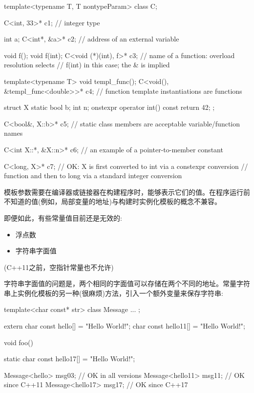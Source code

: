 \begin{cpp}
template<typename T, T nontypeParam>
class C;

C<int, 33>* c1; // integer type

int a;
C<int*, &a>* c2; // address of an external variable

void f();
void f(int);
C<void (*)(int), f>* c3; // name of a function: overload resolution selects
						// f(int) in this case; the & is implied

template<typename T> void templ_func();
C<void(), &templ_func<double>>* c4; // function template instantiations are functions

struct X {
	static bool b;
	int n;
	onstexpr operator int() const { return 42; }
};

C<bool&, X::b>* c5; // static class members are acceptable variable/function names

C<int X::*, &X::n>* c6; // an example of a pointer-to-member constant

C<long, X{}>* c7; // OK: X is first converted to int via a constexpr conversion
// function and then to long via a standard integer conversion
\end{cpp}

模板参数需要在编译器或链接器在构建程序时，能够表示它们的值。在程序运行前不知道的值(例如，局部变量的地址)与构建时实例化模板的概念不兼容。

即便如此，有些常量值目前还是无效的:

\begin{itemize}
\item 
浮点数

\item 
字符串字面值
\end{itemize}

(C++11之前，空指针常量也不允许)

字符串字面值的问题是，两个相同的字面值可以存储在两个不同的地址。常量字符串上实例化模板的另一种(很麻烦)方法，引入一个额外变量来保存字符串:

\begin{cpp}
template<char const* str>
class Message {
	...
};

extern char const hello[] = "Hello World!";
char const hello11[] = "Hello World!";

void foo()
{
	static char const hello17[] = "Hello World!";
	
	Message<hello> msg03; // OK in all versions
	Message<hello11> msg11; // OK since C++11
	Message<hello17> msg17; // OK since C++17
}
\end{cpp}

